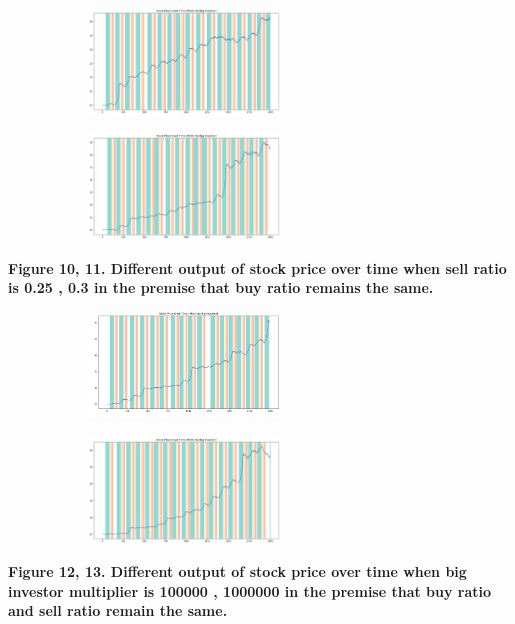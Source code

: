 \documentclass[a4paper, 12pt]{article}
\begin{document}
\begin{figure}[h]
    \centering
    \begin{subfigure}{0.45\textwidth}
        \centering
        \includegraphics[height=80pt,width=\textwidth]{p4.png}
        \label{fig:my_label10}
    \end{subfigure}
    \hfill
    \begin{subfigure}{0.45\textwidth}
        \centering
        \includegraphics[height=80pt,width=\textwidth]{p5.png}
        \label{fig:my_label11}
    \end{subfigure}
\end{figure}

\textbf{Figure 10, 11. Different output of stock price over time when sell ratio is 0.25 , 0.3 in the premise that buy ratio remains the same.}\par

\begin{figure}[h]
    \centering
    \begin{subfigure}{0.45\textwidth}
        \centering
        \includegraphics[height=80pt,width=\textwidth]{p1.png}
        \label{fig:my_label12}
    \end{subfigure}
    \hfill
    \begin{subfigure}{0.45\textwidth}
        \centering
        \includegraphics[height=80pt,width=\textwidth]{p6.png}
        \label{fig:my_label13}
    \end{subfigure}
\end{figure}

\textbf{Figure 12, 13. Different output of stock price over time when big investor multiplier is 100000 , 1000000 in the premise that buy ratio and sell ratio remain the same.}\par
\end{document}
